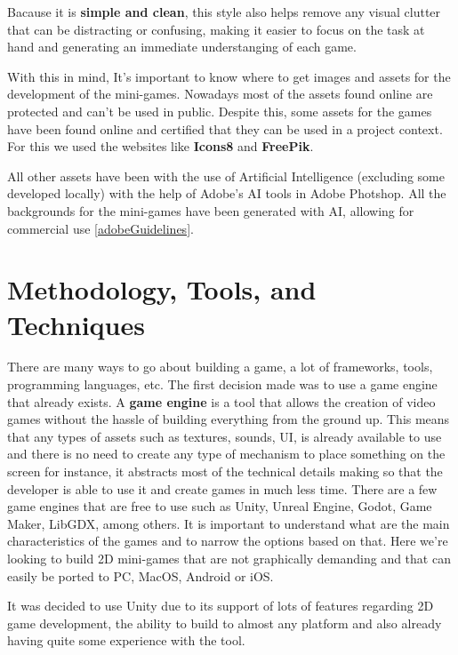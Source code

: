 Bacause it is \textbf{simple and clean}, this style also helps remove any visual clutter that can be distracting or confusing, making it easier to focus on the task at hand and generating an immediate understanging of each game.

With this in mind, It's important to know where to get images and assets for the development of the mini-games. Nowadays most of the assets found online are protected and can't be used in public. Despite this, some assets for the games have been found online and certified that they can be used in a project context. For this we used the websites like \textbf{Icons8} and \textbf{FreePik}.

All other assets have been with the use of Artificial Intelligence (excluding some developed locally) with the help of Adobe's AI tools in Adobe Photshop. All the backgrounds for the mini-games have been generated with AI, allowing for commercial use \ref{adobeGuidelines}.



\newpage
\section{Methodology, Tools, and Techniques}
There are many ways to go about building a game, a lot of frameworks, tools, programming languages, etc. The first decision made was to use a game engine that already exists. A \textbf{game engine} is a tool that allows the creation of video games without the hassle of building everything from the ground up. This means that any types of assets such as textures, sounds, UI, is already available to use and there is no need to create any type of mechanism to place something on the screen for instance, it abstracts most of the technical details making so that the developer is able to use it and create games in much less time. There are a few game engines that are free to use such as Unity, Unreal Engine, Godot, Game Maker, LibGDX, among others.
It is important to understand what are the main characteristics of the games and to narrow the options based on that.
Here we're looking to build 2D mini-games that are not graphically demanding and that can easily be ported to PC, MacOS, Android or iOS.

It was decided to use Unity due to its support of lots of features regarding 2D game development, the ability to build to almost any platform and also already having quite some experience with the tool.

